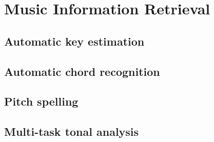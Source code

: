 \section{Music Information Retrieval}
\subsection{Automatic key estimation}



\subsection{Automatic chord recognition}
\subsection{Pitch spelling}
\subsection{Multi-task tonal analysis}
